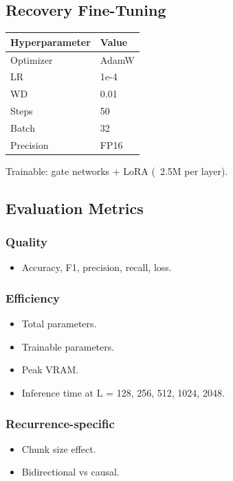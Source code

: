 \subsection{Recovery Fine-Tuning}

\begin{table}[H]
\centering
\small
\begin{tabular}{ll}
\toprule
\textbf{Hyperparameter} & \textbf{Value} \\
\midrule
Optimizer & AdamW \\
LR & 1e-4 \\
WD & 0.01 \\
Steps & 50 \\
Batch & 32 \\
Precision & FP16 \\
\bottomrule
\end{tabular}
\end{table}

Trainable: gate networks + LoRA (~2.5M per layer).

\subsection{Evaluation Metrics}

\subsubsection{Quality}
\begin{itemize}
\item Accuracy, F1, precision, recall, loss.

\end{itemize}
\subsubsection{Efficiency}
\begin{itemize}
\item Total parameters.
\item Trainable parameters.
\item Peak VRAM.
\item Inference time at L = 128, 256, 512, 1024, 2048.

\end{itemize}
\subsubsection{Recurrence-specific}
\begin{itemize}
\item Chunk size effect.
\item Bidirectional vs causal.

\end{itemize}
